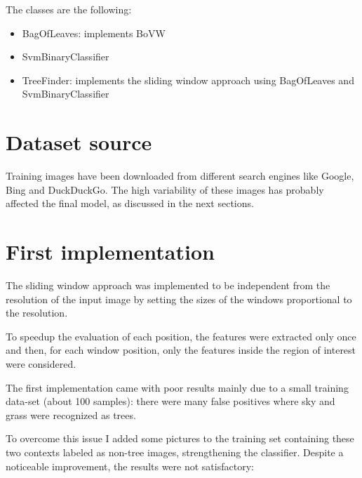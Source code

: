 \documentclass[]{report}
\begin{document}
The classes are the following:

\begin{itemize}
	\item  BagOfLeaves: implements BoVW
	\item SvmBinaryClassifier
	\item TreeFinder: implements the sliding window approach using BagOfLeaves and SvmBinaryClassifier
\end{itemize}

\section{Dataset source}
Training images have been downloaded from different search engines like Google, Bing and DuckDuckGo.
The high variability of these images has probably affected the final model, as discussed in the next sections.

\newpage
\section{First implementation}
The sliding window approach was implemented to be independent from the resolution of the input image by setting the sizes of the windows proportional to the resolution.

To speedup the evaluation of each position, the features were extracted only once and then, for each window position, only the features inside the region of interest were considered.

The first implementation came with poor results mainly due to a small training data-set (about 100 samples): there were many false positives where sky and grass were recognized as trees. 

To overcome this issue I added some pictures to the training set containing these two contexts labeled as non-tree images, strengthening the classifier. 
Despite a noticeable  improvement, the results were not satisfactory:

\vspace{0.5cm}
\end{document}
